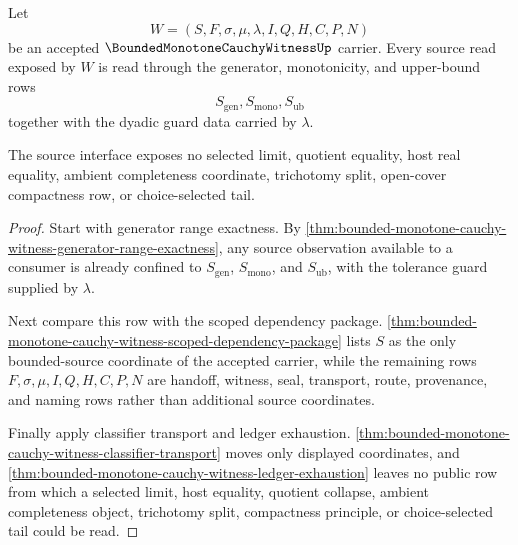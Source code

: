 \begin{theorem}
\label{thm:bounded-monotone-cauchy-witness-source-row-scope}
Let
$$
W=(S,F,\sigma,\mu,\lambda,I,Q,H,C,P,N)
$$
be an accepted $\BoundedMonotoneCauchyWitnessUp$ carrier. Every source read exposed by $W$ is read through the generator, monotonicity, and upper-bound rows
$$
S_{\mathrm{gen}},S_{\mathrm{mono}},S_{\mathrm{ub}}
$$
together with the dyadic guard data carried by $\lambda$.

The source interface exposes no selected limit, quotient equality, host real equality, ambient completeness coordinate, trichotomy split, open-cover compactness row, or choice-selected tail.
\end{theorem}
\begin{proof}
Start with generator range exactness. By \autoref{thm:bounded-monotone-cauchy-witness-generator-range-exactness}, any source observation available to a consumer is already confined to $S_{\mathrm{gen}}$, $S_{\mathrm{mono}}$, and $S_{\mathrm{ub}}$, with the tolerance guard supplied by $\lambda$.

Next compare this row with the scoped dependency package. \autoref{thm:bounded-monotone-cauchy-witness-scoped-dependency-package} lists $S$ as the only bounded-source coordinate of the accepted carrier, while the remaining rows $F,\sigma,\mu,I,Q,H,C,P,N$ are handoff, witness, seal, transport, route, provenance, and naming rows rather than additional source coordinates.

Finally apply classifier transport and ledger exhaustion. \autoref{thm:bounded-monotone-cauchy-witness-classifier-transport} moves only displayed coordinates, and \autoref{thm:bounded-monotone-cauchy-witness-ledger-exhaustion} leaves no public row from which a selected limit, host equality, quotient collapse, ambient completeness object, trichotomy split, compactness principle, or choice-selected tail could be read.
\end{proof}

